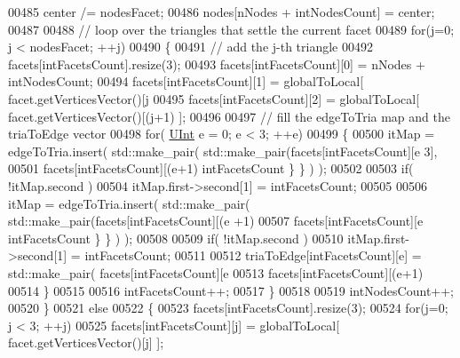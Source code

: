 \begin{DoxyCode}
00485                 center /= nodesFacet;
00486                 nodes[nNodes + intNodesCount] = center;
00487 
00488                 \textcolor{comment}{// loop over the triangles that settle the current facet}
00489                 \textcolor{keywordflow}{for}(j=0; j < nodesFacet; ++j)
00490                 \{
00491                     \textcolor{comment}{// add the j-th triangle}
00492                     facets[intFacetsCount].resize(3);
00493                     facets[intFacetsCount][0] = nNodes + intNodesCount;
00494                     facets[intFacetsCount][1] = globalToLocal[ facet.getVerticesVector()[j%
00495                     facets[intFacetsCount][2] = globalToLocal[ facet.getVerticesVector()[(j+1)%
      ];
00496 
00497                     \textcolor{comment}{// fill the edgeToTria map and the triaToEdge vector}
00498                     \textcolor{keywordflow}{for}( \hyperlink{namespaceFVCode3D_a4bf7e328c75d0fd504050d040ebe9eda}{UInt} e = 0; e < 3; ++e)
00499                     \{
00500                         itMap = edgeToTria.insert( std::make\_pair( std::make\_pair(facets[intFacetsCount][e%
      3],
00501                                 facets[intFacetsCount][(e+1)%
      intFacetsCount \} \} ) );
00502 
00503                         \textcolor{keywordflow}{if}( !itMap.second )
00504                             itMap.first->second[1] = intFacetsCount;
00505 
00506                         itMap = edgeToTria.insert( std::make\_pair( std::make\_pair(facets[intFacetsCount][(e
      +1)%
00507                                 facets[intFacetsCount][e%
      intFacetsCount \} \} ) );
00508 
00509                         \textcolor{keywordflow}{if}( !itMap.second )
00510                             itMap.first->second[1] = intFacetsCount;
00511 
00512                         triaToEdge[intFacetsCount][e] = std::make\_pair( facets[intFacetsCount][e%
00513                                                                         facets[intFacetsCount][(e+1)%
00514                     \}
00515 
00516                     intFacetsCount++;
00517                 \}
00518 
00519                 intNodesCount++;
00520             \}
00521             \textcolor{keywordflow}{else}
00522             \{
00523                 facets[intFacetsCount].resize(3);
00524                 \textcolor{keywordflow}{for}(j=0; j < 3; ++j)
00525                     facets[intFacetsCount][j] = globalToLocal[ facet.getVerticesVector()[j] ];

\end{DoxyCode}
